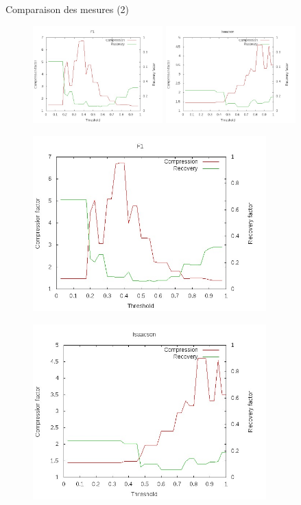 \documentclass[10pt]{beamer}
\begin{document}
\begin{frame}{Comparaison des mesures (2)}
 {
\begin{figure}
\centering
\includegraphics[width = 5cm]{images/F1Diag.jpg} \hspace{0.5cm}
\includegraphics[width = 5cm]{images/IsaacsonDiag.jpg}
\end{figure}}

 {
\begin{figure}
\centering
\includegraphics[width = 9cm]{images/F1Diag.jpg}
\end{figure}}

 {
\begin{figure}
\centering
\includegraphics[width = 9cm]{images/IsaacsonDiag.jpg}
\end{figure}}
\end{frame}
\end{document}
